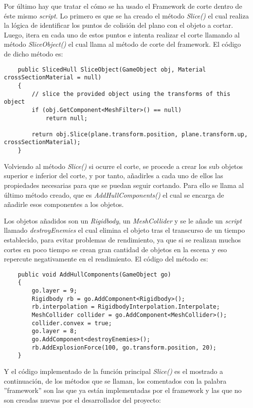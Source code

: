 Por último hay que tratar el cómo se ha usado el Framework de corte dentro de éste mismo \textit{script}. Lo primero es que se ha creado el método \textit{Slice()} el cual realiza la lógica de identificar los puntos de colisión del plano con el objeto a cortar. Luego, itera en cada uno de estos puntos e intenta realizar el corte llamando al método \textit{SliceObject()} el cual llama al método de corte del framework. El código de dicho método es: 

\begin{lstlisting}
    public SlicedHull SliceObject(GameObject obj, Material crossSectionMaterial = null)
    {
        // slice the provided object using the transforms of this object
        if (obj.GetComponent<MeshFilter>() == null)
            return null;

        return obj.Slice(plane.transform.position, plane.transform.up, crossSectionMaterial);
    }
\end{lstlisting}

Volviendo al método \textit{Slice()} si ocurre el corte, se procede a crear los sub objetos superior e inferior del corte, y por tanto, añadirles a cada uno de ellos las propiedades necesarias para que se puedan seguir cortando. Para ello se llama al último método creado, que es \textit{AddHullComponents()} el cual se encarga de añadirle esos componentes a los objetos.

Los objetos añadidos son un \textit{Rigidbody}, un \textit{MeshCollider} y se le añade un \textit{script} llamado \textit{destroyEnemies} el cual elimina el objeto tras el transcurso de un tiempo establecido, para evitar problemas de rendimiento, ya que si se realizan muchos cortes en poco tiempo se crean gran cantidad de objetos en la escena y eso repercute negativamente en el rendimiento. El código del método es:

\begin{lstlisting}
    public void AddHullComponents(GameObject go)
    {
        go.layer = 9;
        Rigidbody rb = go.AddComponent<Rigidbody>();
        rb.interpolation = RigidbodyInterpolation.Interpolate;
        MeshCollider collider = go.AddComponent<MeshCollider>();
        collider.convex = true;
        go.layer = 8;
        go.AddComponent<destroyEnemies>();
        rb.AddExplosionForce(100, go.transform.position, 20);
    }
\end{lstlisting}

Y el código implementado de la función principal \textit{Slice()} es el mostrado a continuación, de los métodos que se llaman, los comentados con la palabra ''framework'' son las que ya están implementadas por el framework y las que no son creadas nuevas por el desarrollador del proyecto: 

